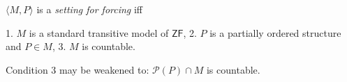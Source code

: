 $\langle M, P \rangle$ is a \emph{setting for forcing} iff

1. $M$ is a standard transitive model of $\mathsf{ZF}$,
2. $P$ is a partially ordered structure and $P \in M$,
3. $M$ is countable.

Condition 3 may be weakened to: $\mathcal{P}(P) \cap M$ is countable.
